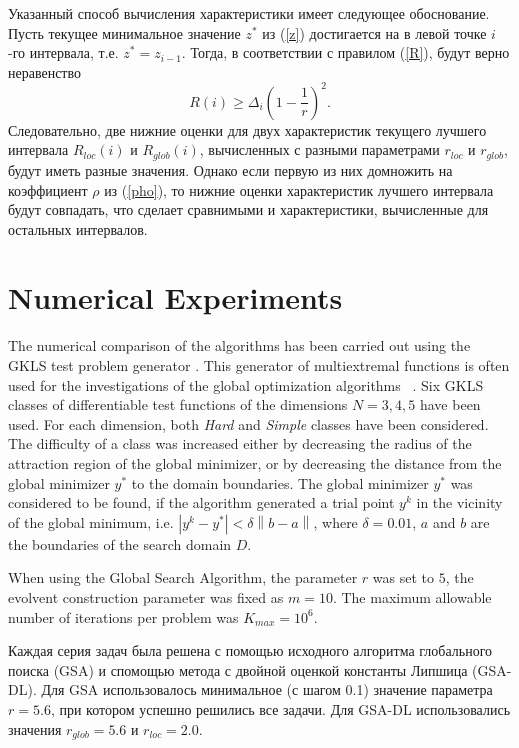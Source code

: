 \documentclass[runningheads]{llncs}
\begin{document}
Указанный способ вычисления характеристики имеет следующее обоснование. 
Пусть текущее минимальное значение $z^*$ из (\ref{z}) достигается на в левой точке $i$-го интервала, т.е. $z^* = z_{i-1}$. Тогда, в соответствии с правилом (\ref{R}), будут верно неравенство
\[
R(i) \geq \Delta_i \left( 1 - \frac{1}{r} \right)^2.
\]
Следовательно, две нижние оценки для двух характеристик текущего лучшего интервала $R_{loc}(i)$ и $R_{glob}(i)$, вычисленных с разными параметрами $r_{loc}$ и $r_{glob}$, будут иметь разные значения.
Однако если первую из них домножить на коэффициент $\rho$ из (\ref{pho}), то нижние оценки характеристик лучшего интервала будут совпадать, что сделает сравнимыми и характеристики, вычисленные для остальных интервалов.

\section{Numerical Experiments}

The numerical comparison of the algorithms has been carried out using the GKLS 
test problem generator \cite{Gaviano2003}. 
This generator of multiextremal functions is often used for the investigations of the global 
optimization algorithms ~\cite{Paulavicius2014,Sergeyev2015,%
Barkalov2018}.
Six GKLS classes of differentiable test functions of the dimensions $N = 3,4,5$
have been used. For each dimension, both \textit{Hard} and \textit{Simple}
classes have been considered. The difficulty of a class was increased either by
decreasing the radius of the attraction region of the global minimizer, or by
decreasing the distance from the global minimizer $y^\ast$ to the domain
boundaries. The global minimizer $y^\ast$ was considered to be found, if the
algorithm generated a trial point $y^k$ in the vicinity of the global minimum,
i.e. $\left|y^k-y^\ast\right| <\delta\left\|b-a\right\|$, where $\delta = 0.01$,
$a$ and $b$ are the boundaries of the search domain $D$. 

When using the Global Search Algorithm, the parameter $r$ was set to $5$, 
the evolvent construction parameter was fixed as $m = 10$. 
The maximum allowable number of iterations per problem was $K_{max} = 10^6$.

Каждая серия задач была решена с помощью исходного алгоритма глобального поиска (GSA) и спомощью метода с двойной оценкой константы Липшица (GSA-DL). Для GSA использовалось минимальное (с шагом 0.1) значение параметра $r = 5.6$, при котором успешно решились все задачи.
Для GSA-DL использовались значения $r_{glob} = 5.6$ и $r_{loc} = 2.0$. 
\end{document}
